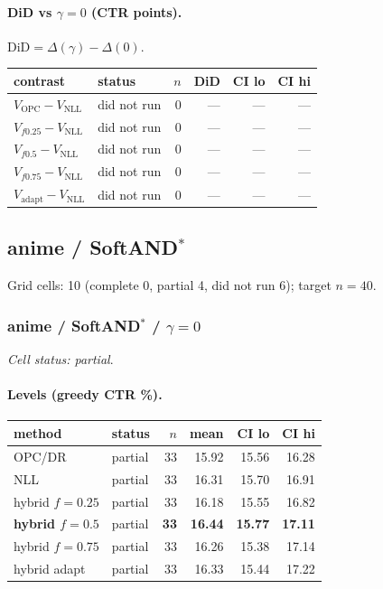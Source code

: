 \documentclass[10pt,a4paper]{article}
\begin{document}
\paragraph{DiD vs $\gamma=0$ (CTR points).} $\mathrm{DiD}=\Delta(\gamma)-\Delta(0)$.
{\centering\small\begin{tabular}{llrrrr}
\toprule contrast & status & $n$ & DiD & CI lo & CI hi \\
\midrule
$V_{\mathrm{OPC}}-V_{\mathrm{NLL}}$ & did not run & 0 & --- & --- & --- \\
$V_{f0.25}-V_{\mathrm{NLL}}$ & did not run & 0 & --- & --- & --- \\
$V_{f0.5}-V_{\mathrm{NLL}}$ & did not run & 0 & --- & --- & --- \\
$V_{f0.75}-V_{\mathrm{NLL}}$ & did not run & 0 & --- & --- & --- \\
$V_{\mathrm{adapt}}-V_{\mathrm{NLL}}$ & did not run & 0 & --- & --- & --- \\
\bottomrule\end{tabular}\par}
\bigskip
\newpage
\subsection{anime / SoftAND$^*$}
Grid cells: 10 (complete 0, partial 4, did not run 6); target $n=40$.
\subsubsection{anime / SoftAND$^*$ / $\gamma=0$}
\emph{Cell status: partial}.
\paragraph{Levels (greedy CTR \%).}
{\centering\small\begin{tabular}{llrrrr}
\toprule method & status & $n$ & mean & CI lo & CI hi \\
\midrule
OPC/DR & partial & 33 & 15.92 & 15.56 & 16.28 \\
NLL & partial & 33 & 16.31 & 15.70 & 16.91 \\
hybrid $f{=}0.25$ & partial & 33 & 16.18 & 15.55 & 16.82 \\
\textbf{hybrid $f{=}0.5$} & partial & \textbf{33} & \textbf{16.44} & \textbf{15.77} & \textbf{17.11} \\
hybrid $f{=}0.75$ & partial & 33 & 16.26 & 15.38 & 17.14 \\
hybrid adapt & partial & 33 & 16.33 & 15.44 & 17.22 \\
\bottomrule\end{tabular}\par}
\end{document}
